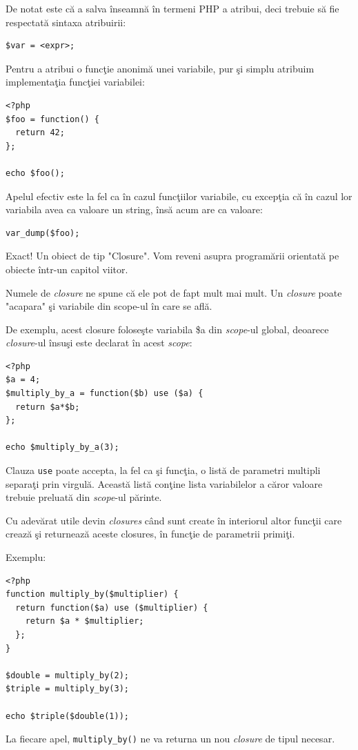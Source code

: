 De notat este că a salva înseamnă în termeni PHP a atribui, deci
trebuie să fie respectată sintaxa atribuirii:
\begin{verbatim}
$var = <expr>;
\end{verbatim}
Pentru a atribui o funcţie anonimă unei variabile, pur şi simplu
atribuim implementaţia funcţiei variabilei:
\begin{lstlisting}
<?php
$foo = function() {
  return 42;
};

echo $foo();
\end{lstlisting}
Apelul efectiv este la fel ca în cazul funcţiilor variabile,
cu excepţia că în cazul lor variabila avea ca valoare un string, însă
acum are ca valoare:
\begin{lstlisting}
var_dump($foo);
\end{lstlisting}
Exact! Un obiect de tip "Closure". Vom reveni asupra
programării orientată pe obiecte
într-un capitol viitor.

Numele de \textit{closure} ne spune că ele pot de fapt mult mai mult.
Un \textit{closure} poate "acapara" şi variabile din scope-ul în care se află.

De exemplu, acest closure foloseşte variabila \$a din \textit{scope}-ul global,
deoarece \textit{closure}-ul însuşi este declarat în acest \textit{scope}:
\begin{lstlisting}
<?php
$a = 4;
$multiply_by_a = function($b) use ($a) {
  return $a*$b;
};

echo $multiply_by_a(3);
\end{lstlisting}
Clauza \texttt{use} poate accepta,
la fel ca şi funcţia, o listă de parametri multipli
separaţi prin virgulă. Această listă conţine lista variabilelor
a căror valoare trebuie preluată din \textit{scope}-ul părinte.

Cu adevărat utile devin \textit{closures} când sunt 
create în interiorul altor funcţii care crează şi
returnează aceste closures, în funcţie de parametrii primiţi.

Exemplu:
\begin{lstlisting}
<?php
function multiply_by($multiplier) {
  return function($a) use ($multiplier) {
	return $a * $multiplier;
  };
}

$double = multiply_by(2);
$triple = multiply_by(3);

echo $triple($double(1));
\end{lstlisting}
La fiecare apel, \texttt{multiply\_by()} ne va returna
un nou \textit{closure} de tipul necesar.

